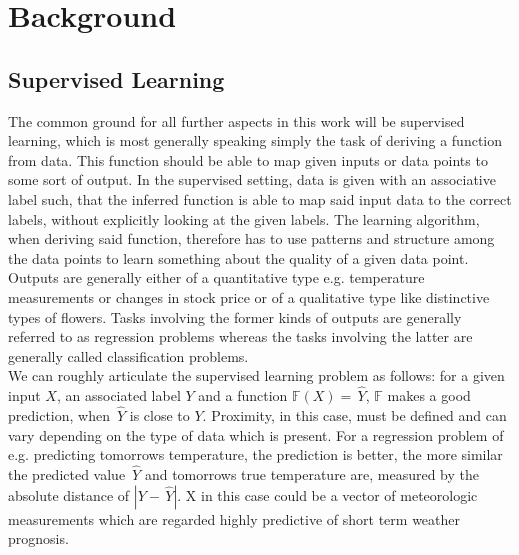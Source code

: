 \section{Background}
\subsection{Supervised Learning}
\newcommand\yhat{\,\hat{y}}
\newcommand\Yhat{\, \hat{Y}}

The common ground for all further aspects in this work will be supervised learning, which is most generally speaking simply the task of deriving a function from data. This function should be able to map given inputs or data points to some sort of output. In the supervised setting, data is given with an associative label such, that the inferred function is able to map said input data to the correct labels, without explicitly looking at the given labels. The learning algorithm, when deriving said function, therefore has to use patterns and structure among the data points to learn something about the quality of a given data point. Outputs are generally either of a quantitative type e.g. temperature measurements or changes in stock price or of a qualitative type like distinctive types of flowers. Tasks involving the former kinds of outputs are generally referred to as regression problems whereas the tasks involving the latter are generally called classification problems.
\\We can roughly articulate the supervised learning problem as follows: for a given input $X$, an associated label $Y$ and a function $ \mathbb{F}(X)= \Yhat$, $\mathbb{F}$ makes a good prediction, when $\Yhat$ is close to $Y$. Proximity, in this case, must be defined and can vary depending on the type of data which is present. For a regression problem of e.g. predicting tomorrows temperature, the prediction is better, the more similar the predicted value $\Yhat$ and tomorrows true temperature are, measured by the absolute distance of $|Y-\Yhat|$.
X in this case could be a vector of meteorologic measurements which are regarded highly predictive of short term weather prognosis.
